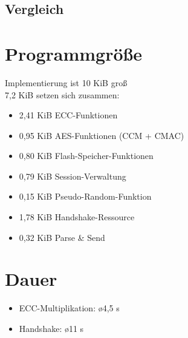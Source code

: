 \subsection{Vergleich}

\section{Programmgröße}

Implementierung ist 10 KiB groß\\
7,2 KiB setzen sich zusammen: 
\begin{itemize}
  \item 2,41 KiB ECC-Funktionen
  \item 0,95 KiB AES-Funktionen (CCM + CMAC)
  \item 0,80 KiB Flash-Speicher-Funktionen
  \item 0,79 KiB Session-Verwaltung
  \item 0,15 KiB Pseudo-Random-Funktion
  \item 1,78 KiB Handshake-Ressource
  \item 0,32 KiB Parse \& Send
\end{itemize}

\section{Dauer}

\begin{itemize}
  \item ECC-Multiplikation: \o 4,5 s
  \item Handshake: \o 11 s
\end{itemize}